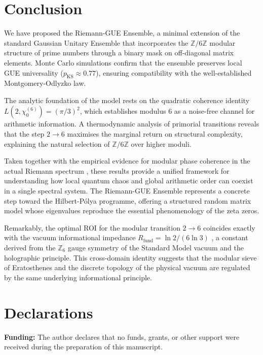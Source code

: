 \documentclass[12pt,a4paper]{article}
\theoremstyle{plain}
\theoremstyle{definition}
\theoremstyle{remark}
\begin{document}
\section{Conclusion}
\label{sec:conclusion}

We have proposed the Riemann-GUE Ensemble, a minimal extension of the standard Gaussian Unitary Ensemble that incorporates the $\mathbb{Z}/6\mathbb{Z}$ modular structure of prime numbers through a binary mask on off-diagonal matrix elements. Monte Carlo simulations confirm that the ensemble preserves local GUE universality ($p_{\mathrm{KS}} \approx 0.77$), ensuring compatibility with the well-established Montgomery-Odlyzko law.

The analytic foundation of the model rests on the quadratic coherence identity $L(2,\chi_0^{(6)}) = (\pi/3)^2$, which establishes modulus $6$ as a noise-free channel for arithmetic information. A thermodynamic analysis of primorial transitions reveals that the step $2 \to 6$ maximises the marginal return on structural complexity, explaining the natural selection of $\mathbb{Z}/6\mathbb{Z}$ over higher moduli.

Taken together with the empirical evidence for modular phase coherence in the actual Riemann spectrum \cite{R1}, these results provide a unified framework for understanding how local quantum chaos and global arithmetic order can coexist in a single spectral system. The Riemann-GUE Ensemble represents a concrete step toward the Hilbert-Pólya programme, offering a structured random matrix model whose eigenvalues reproduce the essential phenomenology of the zeta zeros.

Remarkably, the optimal ROI for the modular transition $2 \to 6$ coincides exactly with the vacuum informational impedance $R_{\mathrm{fund}} = \ln 2/(6\ln 3)$ \cite{MSTfound}, a constant derived from the $\mathbb{Z}_6$ gauge symmetry of the Standard Model vacuum and the holographic principle. This cross-domain identity suggests that the modular sieve of Eratosthenes and the discrete topology of the physical vacuum are regulated by the same underlying informational principle.

\section*{Declarations}

\textbf{Funding:} The author declares that no funds, grants, or other support were received during the preparation of this manuscript.
\end{document}
